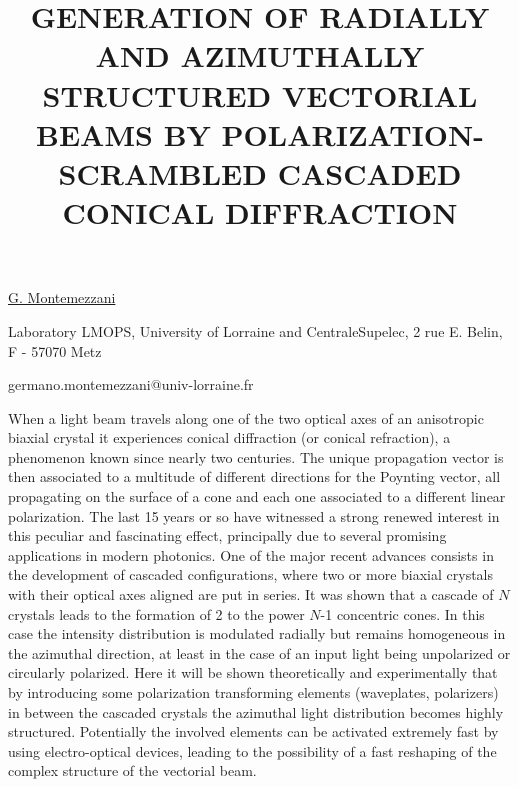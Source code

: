 \title{GENERATION OF RADIALLY AND AZIMUTHALLY STRUCTURED VECTORIAL BEAMS BY POLARIZATION-SCRAMBLED CASCADED CONICAL DIFFRACTION}

\underline{G. Montemezzani} 

{\normalsize{\vspace{-4mm}
Laboratory LMOPS,
University of Lorraine and CentraleSupelec,
2 rue E. Belin,
F - 57070 Metz

\email germano.montemezzani@univ-lorraine.fr}}

When a light beam travels along one of the two optical axes of an anisotropic biaxial crystal it experiences conical diffraction (or conical refraction), a phenomenon known since nearly two centuries. The unique propagation vector is then associated to a multitude of different directions for the Poynting vector, all propagating on the surface of a cone and each one associated to a different linear polarization. The last 15 years or so have witnessed a strong renewed interest in this peculiar and fascinating effect, principally due to several promising applications in modern photonics. One of the major recent advances consists in the development of cascaded configurations, where two or more biaxial crystals with their optical axes aligned are put in series. It was shown that a cascade of $N$ crystals leads to the formation of 2 to the power $N$-1 concentric cones. In this case the intensity distribution is modulated radially but remains homogeneous in the azimuthal direction, at least in the case of an input light being unpolarized or circularly polarized. Here it will be shown theoretically and experimentally that by introducing some polarization transforming elements (waveplates, polarizers) in between the cascaded crystals the azimuthal light distribution becomes highly structured. Potentially the involved elements can be activated extremely fast by using electro-optical devices, leading to the possibility of a fast reshaping of the complex structure of the vectorial beam.

\vspace{\baselineskip}